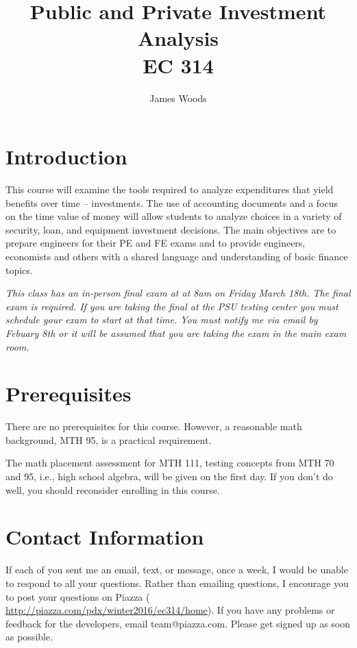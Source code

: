 \documentclass[letterpaper,10pt]{article}
\date{}
\title{Public and Private Investment Analysis\\  
EC 314\\
\Term}
\author{James Woods}
\newif\ifhybrid
\newif\ifonline
\newcommand{\Piazza}{\url{ http://piazza.com/pdx/winter2016/ec314/home}}
\newcommand{\FinalExam}{at 8am on Friday March 18th}
\newcommand{\DRCDate}{Febuary 8th }
\begin{document}
  
\maketitle

\section{Introduction}

This course will examine the tools required to analyze expenditures
that yield benefits over time -- investments. The use of accounting
documents and a focus on the time value of money will allow students
to analyze choices in a variety of security, loan, and equipment
investment decisions. The main objectives are to prepare engineers for their PE and FE exams and to
provide engineers, economists and others with a shared language and
understanding of basic finance topics.


\ifhybrid  \fi
\ifonline  \fi

\emph{This class has an in-person final exam at \FinalExam.  The final exam is required. If you are taking the final at the PSU testing center you must schedule your exam to start at that time.  You must notify me via email by \DRCDate or it will be assumed that you are taking the exam in the main exam room.}

\section{Prerequisites}

There are no prerequisites for this course. However, a reasonable math
background, MTH 95, is a practical requirement. 

\ifonline
  
  \else
    The math placement assessment for MTH 111, testing concepts from MTH 70 and 95, i.e., high school algebra, will be given on the first day.  If you don't do well, you should reconsider enrolling in this course.
\fi

\section{Contact Information}

If each of you sent me an email, text, or message, once a week, I would be unable to respond to all your questions.  Rather than emailing questions, I encourage you to post your questions on Piazza (\Piazza). If you have any problems or feedback for the developers, email team@piazza.com. Please get signed up as soon as possible. 
\end{document}
